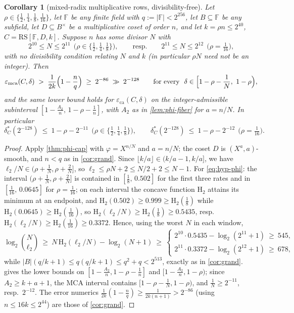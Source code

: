 \documentclass[11pt]{article}
\newtheorem{corollary}[corollary]{Corollary}
\theoremstyle{definition}
\theoremstyle{remark}
\newcommand{\F}{\mathbb{F}}
\newcommand{\B}{B}
\newcommand{\RS}{\mathrm{RS}}
\newcommand{\eca}{\varepsilon_{\mathrm{ca}}}
\newcommand{\emca}{\varepsilon_{\mathrm{mca}}}
\newcommand{\Hb}{\mathrm{H}_2}
\begin{document}
\begin{corollary}[mixed-radix multiplicative rows, divisibility-free]\label{cor:mixed-radix}
Let $\rho\in\{\frac12,\frac14,\frac18,\frac1{16}\}$, let $\F$ be any finite field with $q:=|\F|<2^{256}$, let $\B\subseteq\F$ be any subfield, let $D\subseteq\B^\times$ be a multiplicative coset of order $n$, and let $k=\rho n\le2^{40}$, $C=\RS[\F,D,k]$. Suppose $n$ has \emph{some} divisor $N$ with
\[
2^{10}\le N\le2^{11}\ \ \bigl(\rho\in\{\tfrac12,\tfrac14,\tfrac18\}\bigr),
\qquad\text{resp.}\qquad
2^{11}\le N\le2^{12}\ \ \bigl(\rho=\tfrac1{16}\bigr),
\]
with no divisibility condition relating $N$ and $k$ \textup(in particular $\rho N$ need not be an integer\textup). Then
\[
\emca(C,\delta)\;>\;\frac1{2k}\Bigl(1-\frac nq\Bigr)\;\ge\;2^{-86}\;\gg\;2^{-128}
\qquad\text{for every }\ \delta\in\Bigl[1-\rho-\frac1N,\ 1-\rho\Bigr),
\]
and the same lower bound holds for $\eca(C,\delta)$ on the integer-admissible subinterval $[1-\frac{A_2}n,\,1-\rho-\frac1n]$, with $A_2$ as in \cref{lem:phi-fiber} for $a=n/N$. In particular
\[
\delta^*_C(2^{-128})\ \le\ 1-\rho-2^{-11}\ \ \bigl(\rho\in\{\tfrac12,\tfrac14,\tfrac18\}\bigr),
\qquad
\delta^*_C(2^{-128})\ \le\ 1-\rho-2^{-12}\ \ \bigl(\rho=\tfrac1{16}\bigr).
\]
\end{corollary}

\begin{proof}
Apply \cref{thm:phi-cap} with $\varphi=X^{n/N}$ and $a=n/N$; the coset $D$ is $(X^a,a)$-smooth, and $n<q$ as in \cref{cor:grand}. Since $\lfloor k/a\rfloor\in(k/a-1,k/a]$, we have $\ell_2/N\in(\rho+\frac1N,\rho+\frac2N]$, so $\ell_2\le\rho N+2\le N/2+2\le N-1$. For \eqref{eq:hyp-phi}: the interval $(\rho+\frac1N,\rho+\frac2N]$ is contained in $[\frac18,\,0.502]$ for the first three rates and in $[\frac1{16},\,0.0645]$ for $\rho=\frac1{16}$; on each interval the concave function $\Hb$ attains its minimum at an endpoint, and $\Hb(0.502)\ge0.999\ge\Hb(\frac18)$ while $\Hb(0.0645)\ge\Hb(\frac1{16})$, so $\Hb(\ell_2/N)\ge\Hb(\frac18)\ge0.5435$, resp.\ $\Hb(\ell_2/N)\ge\Hb(\frac1{16})\ge0.3372$. Hence, using the worst $N$ in each window,
\[
\log_2\binom N{\ell_2}\ \ge\ N\,\Hb(\ell_2/N)-\log_2(N+1)\ \ge\
\begin{cases}
2^{10}\cdot0.5435-\log_2(2^{11}+1)\ \ge\ 545,\\[2pt]
2^{11}\cdot0.3372-\log_2(2^{12}+1)\ \ge\ 678,
\end{cases}
\]
while $|\B|(q/k+1)\le q(q/k+1)\le q^2+q<2^{513}$, exactly as in \cref{cor:grand}.  gives the lower bounds on $[1-\frac{A_2}n,1-\rho-\frac1n]$ and $[1-\frac{A_2}n,1-\rho)$; since $A_2\ge k+a+1$, the MCA interval contains $[1-\rho-\frac1N,1-\rho)$, and $\frac1N\ge2^{-11}$, resp.\ $2^{-12}$. The error numerics $\frac1{2k}(1-\frac nq)\ge\frac1{2k(n+1)}>2^{-86}$ (using $n\le16k\le2^{44}$) are those of \cref{cor:grand}.
\end{proof}
\end{document}
